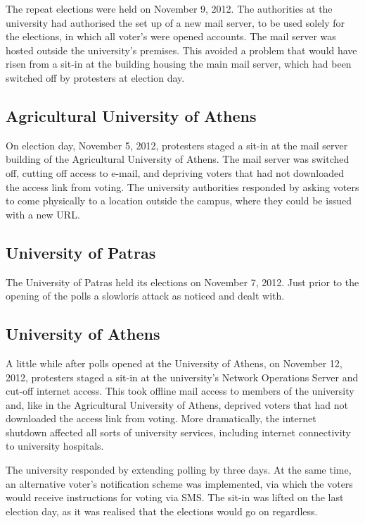 \documentclass[letterpaper,twocolumn,10pt]{article}
\begin{document}
The repeat elections were held on November 9, 2012. The authorities at
the university had authorised the set up of a new mail server, to be
used solely for the elections, in which all voter's were opened
accounts. The mail server was hosted outside the university's
premises. This avoided a problem that would have risen from a sit-in
at the building housing the main mail server, which had been switched
off by protesters at election day.

\subsection{Agricultural University of Athens}

On election day, November 5, 2012, protesters staged a sit-in at the
mail server building of the Agricultural University of Athens. The
mail server was switched off, cutting off access to e-mail, and
depriving voters that had not downloaded the access link from voting.
The university authorities responded by asking voters to come
physically to a location outside the campus, where they could be
issued with a new URL.

\subsection{University of Patras}

The University of Patras held its elections on November 7, 2012. Just
prior to the opening of the polls a slowloris attack as noticed and
dealt with.

\subsection{University of Athens}

A little while after polls opened at the University of Athens, on
November 12, 2012, protesters staged a sit-in at the university's
Network Operations Server and cut-off internet access. This took
offline mail access to members of the university and, like in the
Agricultural University of Athens, deprived voters that had not
downloaded the access link from voting. More dramatically, the
internet shutdown affected all sorts of university services, including
internet connectivity to university hospitals.

The university responded by extending polling by three days. At the
same time, an alternative voter's notification scheme was implemented,
via which the voters would receive instructions for voting via SMS.
The sit-in was lifted on the last election day, as it was realised
that the elections would go on regardless.
\end{document}
